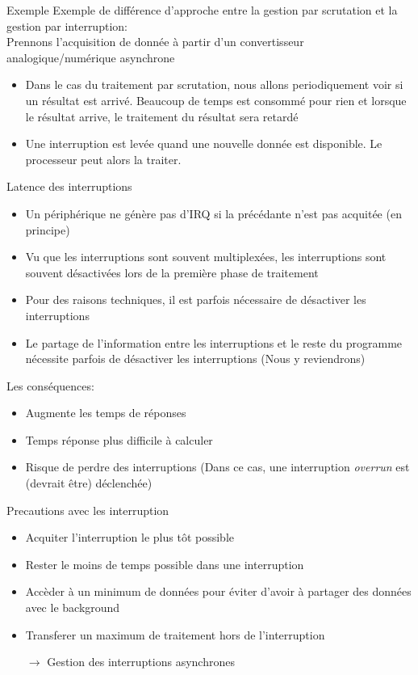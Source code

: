 \begin{frame}{Exemple}
  Exemple de différence d'approche entre la gestion par scrutation et 
  la gestion par interruption:\\

  Prennons  l'acquisition  de   donnée  à  partir  d'un  convertisseur
  analogique/numérique asynchrone
  \begin{itemize}
  \item  Dans  le  cas  du  traitement  par  scrutation,  nous  allons
    periodiquement voir  si un résultat est arrivé.  Beaucoup de temps
    est  consommé  pour  rien   et  lorsque  le  résultat  arrive,  le
    traitement du résultat sera retardé
  \item  Une interruption  est  levée quand  une  nouvelle donnée  est
    disponible. Le processeur peut alors la traiter.
  \end{itemize}
\end{frame} 

\begin{frame}{Latence des interruptions}
  \begin{itemize} 
  \item Un périphérique ne génère pas d'IRQ si la précédante n'est pas
    acquitée (en principe)
  \item Vu  que les  interruptions sont souvent  multiplexées, les
    interruptions sont  souvent désactivées lors de  la première phase
    de traitement
  \item  Pour des  raisons techniques,  il est  parfois  nécessaire de
    désactiver les interruptions
  \item  Le partage  de l'information  entre les  interruptions  et le
    reste   du   programme  nécessite   parfois   de  désactiver   les
    interruptions (Nous y reviendrons)
  \end{itemize} 
  Les conséquences:
  \begin{itemize} 
  \item Augmente les temps de réponses
  \item Temps réponse plus difficile à calculer
  \item  Risque   de  perdre  des  interruptions  (Dans   ce  cas,  une
    interruption \emph{overrun} est (devrait être) déclenchée)
  \end{itemize} 
\end{frame} 

\begin{frame}{Precautions avec les interruption}
  \begin{itemize} 
  \item Acquiter l'interruption le plus tôt possible
  \item Rester le moins de temps possible dans une interruption
  \item Accèder à un minimum de données pour éviter d'avoir à partager
    des données avec le background
  \item Transferer un maximum de traitement hors de l'interruption
  \item[$\rightarrow$] Gestion des interruptions asynchrones
  \end{itemize} 
\end{frame} 

